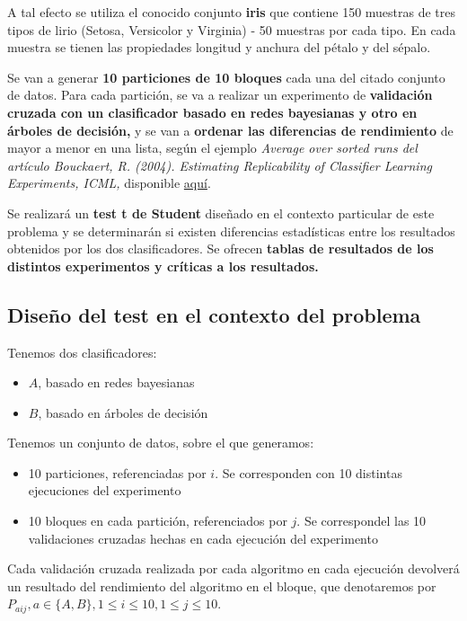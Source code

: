 \documentclass[11pt]{article}
\providecommand{\tightlist}{%
      \setlength{\itemsep}{0pt}\setlength{\parskip}{0pt}}
\begin{document}
A tal efecto se utiliza el conocido conjunto \textbf{iris} que contiene
150 muestras de tres tipos de lirio (Setosa, Versicolor y Virginia) - 50
muestras por cada tipo. En cada muestra se tienen las propiedades
longitud y anchura del pétalo y del sépalo.

Se van a generar \textbf{10 particiones de 10 bloques} cada una del
citado conjunto de datos. Para cada partición, se va a realizar un
experimento de \textbf{validación cruzada con un clasificador basado en
redes bayesianas y otro en árboles de decisión,} y se van a
\textbf{ordenar las diferencias de rendimiento} de mayor a menor en una
lista, según el ejemplo \emph{Average over sorted runs del artículo
Bouckaert, R. (2004). Estimating Replicability of Classifier Learning
Experiments, ICML,} disponible
\href{http://www.aicml.cs.ualberta.ca/_ban_04/icml/pages/papers/61.pdf}{aquí}.

Se realizará un \textbf{test t de Student} diseñado en el contexto
particular de este problema y se determinarán si existen diferencias
estadísticas entre los resultados obtenidos por los dos clasificadores.
Se ofrecen \textbf{tablas de resultados de los distintos experimentos y
críticas a los resultados.}

\subsection{Diseño del test en el contexto del
problema}\label{diseuxf1o-del-test-en-el-contexto-del-problema}

Tenemos dos clasificadores:

\begin{itemize}
\tightlist
\item
  \(A\), basado en redes bayesianas
\item
  \(B\), basado en árboles de decisión
\end{itemize}

Tenemos un conjunto de datos, sobre el que generamos:

\begin{itemize}
\tightlist
\item
  10 particiones, referenciadas por \(i\). Se corresponden con 10
  distintas ejecuciones del experimento
\item
  10 bloques en cada partición, referenciados por \(j\). Se correspondel
  las 10 validaciones cruzadas hechas en cada ejecución del experimento
\end{itemize}

Cada validación cruzada realizada por cada algoritmo en cada ejecución
devolverá un resultado del rendimiento del algoritmo en el bloque, que
denotaremos por
\(P_{aij}, a \in \{A,B\}, 1 \le i \le 10, 1 \le j \le 10\).
\end{document}
